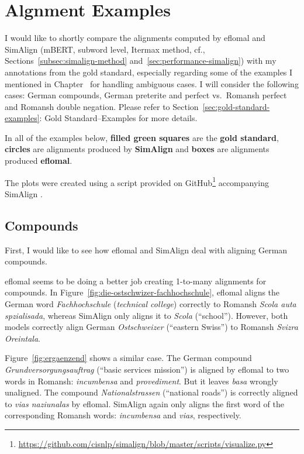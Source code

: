 \chapter{Algnment Examples}\label{appendix-a}

I would like to shortly compare the  alignments computed by eflomal and SimAlign (mBERT, subword level, Itermax method, cf., Sections~\ref{subsec:simalign-method} and~\ref{sec:performance-simalign}) with my annotations from the gold standard, especially regarding some of the examples I mentioned in Chapter~ for handling ambiguous cases.
I will consider the following cases: German compounds,  German preterite and perfect vs.~Romansh perfect and Romansh double negation. 
Please refer to Section~\ref{sec:gold-standard-examples}: Gold Standard--Examples for more details.

In all of the examples below, \textbf{filled green squares} are the \textbf{gold standard},\textbf{ circles} are alignments produced by \textbf{SimAlign} and \textbf{boxes} are alignments produced \textbf{eflomal}. 

The plots were created using a script provided on GitHub\footnote{\url{https://github.com/cisnlp/simalign/blob/master/scripts/visualize.py}} accompanying SimAlign \autocite{jalili-sabet-etal-2020-simalign}.

\section{Compounds}
First, I would like to see how eflomal and SimAlign deal with aligning German compounds.

eflomal seems to be doing a better job creating 1-to-many alignments for compounds. 
In Figure~\ref{fig:die-ostschwizer-fachhochschule}, eflomal aligns  the German word \emph{Fachhochschule} (\emph{technical college}) correctly  to Romansh \emph{Scola auta spzialisada}, whereas SimAlign only aligns it to \emph{Scola} (\enquote{school}). 
However, both models correctly align German \emph{Ostschweizer} (\enquote{eastern Swiss}) to Romansh \emph{Svizra Oreintala}.

Figure~\ref{fig:ergaenzend} shows a similar case. The German compound \emph{Grundversorgungsauftrag} (\enquote{basic services mission}) is aligned by eflomal to two words in Romansh: \emph{incumbensa} and \emph{provediment}. But it leaves \emph{basa} wrongly unaligned. 
The compound \emph{Nationalstrassen} (\enquote{national roads}) is correctly aligned to \emph{vias naziunalas} by eflomal. SimAlign again only aligns the first word of the corresponding Romansh words: \emph{incumbensa}  and \emph{vias}, respectively.

